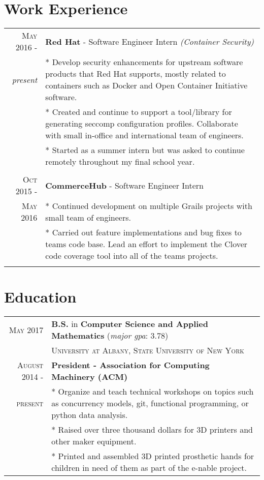 \documentclass[a4paper,10pt]{article}
\begin{document}
\section{Work Experience}
\begin{tabular}{rp{11cm}}


 \textsc{May 2016 -} & \textbf{Red Hat} - Software Engineer Intern \textit{(Container Security)} \\\emph{present}&\footnotesize{* Develop security enhancements for upstream software products that Red Hat supports, mostly related to containers such as Docker and Open Container Initiative software.}\\
 &\footnotesize{* Created and continue to support a tool/library for generating seccomp configuration profiles. Collaborate with small in-office and international team of engineers.}\\
 &\footnotesize{* Started as a summer intern but was asked to continue remotely throughout my final school year.}
 \\\multicolumn{2}{c}{} \\

  \textsc{Oct 2015 -} & \textbf{CommerceHub} - Software Engineer Intern
  \\\textsc{May 2016}
 &\footnotesize{* Continued development on multiple Grails projects with small team of engineers.}\\
 &\footnotesize{* Carried out feature implementations and bug fixes to teams code base. Lead an effort to implement the Clover code coverage tool into all of the teams projects.}\\
 \multicolumn{2}{c}{}

\end{tabular}


\section{Education}
\begin{tabular}{rp{11cm}}
 \textsc{May} 2017 & \textbf{B.S.} in \textbf{Computer Science and Applied Mathematics}  (\textit{major gpa}: 3.78)\\
& \textsc{University at Albany, State University of New York}\\

\textsc{August 2014 -}& \textbf{President - Association for Computing Machinery (ACM)}\\ \textsc{present}
&\footnotesize{* Organize and teach technical workshops on topics such as concurrency models, git, functional programming, or python data analysis.}\\
&\footnotesize{* Raised over three thousand dollars for 3D printers and other maker equipment.}\\
&\footnotesize{* Printed and assembled 3D printed prosthetic hands for children in need of them as part of the e-nable project.}\\
\end{tabular}
\end{document}
